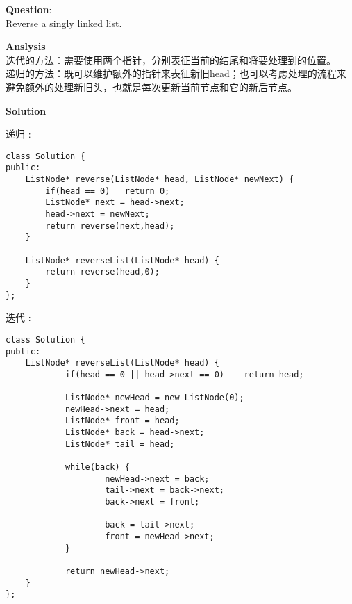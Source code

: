     
\begin{description}
    \item{\textbf{Question}}:\\%
		Reverse a singly linked list.

    \item{\textbf{Anslysis}}\\
		迭代的方法：需要使用两个指针，分别表征当前的结尾和将要处理到的位置。\\
		递归的方法：既可以维护额外的指针来表征新旧head；也可以考虑处理的流程来避免额外的处理新旧头，也就是每次更新当前节点和它的新后节点。\\

    \item{\textbf{Solution}}
	\item{递归} : \\
		\begin{lstlisting}
class Solution {
public:
	ListNode* reverse(ListNode* head, ListNode* newNext) {
		if(head == 0)	return 0;
		ListNode* next = head->next;
		head->next = newNext;
		return reverse(next,head);
	}

    ListNode* reverseList(ListNode* head) {
		return reverse(head,0);
    }
};		\end{lstlisting}
	\item{迭代} : \\
		\begin{lstlisting}
class Solution {
public:
    ListNode* reverseList(ListNode* head) {
			if(head == 0 || head->next == 0)	return head;

			ListNode* newHead = new ListNode(0);
			newHead->next = head;
			ListNode* front = head;
			ListNode* back = head->next;
			ListNode* tail = head;

			while(back) {
					newHead->next = back;
					tail->next = back->next;
					back->next = front;

					back = tail->next;
					front = newHead->next;
			}

			return newHead->next;
    }
};		\end{lstlisting}

\end{description}

